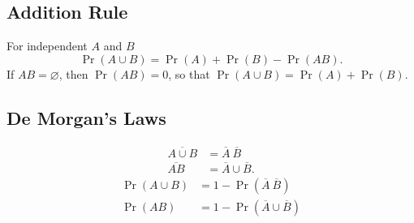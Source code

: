 \documentclass{article}
\begin{document}
\begin{multicols}{3}
    \subsection{Addition Rule}
    For independent \(A\) and \(B\)
    \begin{equation*}
        \Pr{\left( A \cup B \right)} = \Pr{\left( A \right)} + \Pr{\left( B \right)} - \Pr{\left( AB \right)}.
    \end{equation*}
    If \(AB = \varnothing\), then \(\Pr{\left( AB \right)} = 0\), so that \(\Pr{\left( A \cup B \right)} = \Pr{\left( A \right)} + \Pr{\left( B \right)}\).
    \subsection{De Morgan's Laws}
    \begin{align*}
        \overline{A \cup B} & = \overline{A} \ \overline{B}     \\
        \overline{AB}       & = \overline{A} \cup \overline{B}.
    \end{align*}
    \begin{align*}
        \Pr{\left( A \cup B \right)} & = 1 - \Pr{\left( \overline{A} \ \overline{B} \right)}    \\
        \Pr{\left( AB \right)}       & = 1 - \Pr{\left( \overline{A} \cup \overline{B} \right)}
    \end{align*}




\end{multicols}
\end{document}
